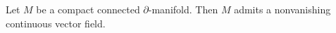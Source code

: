 Let $M$ be a compact connected $\partial$-manifold. Then $M$ admits a nonvanishing continuous vector field.
